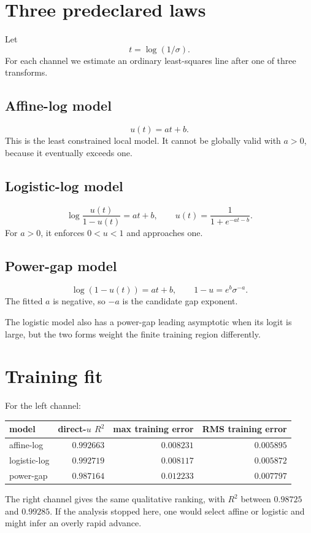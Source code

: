 \documentclass[12pt]{article}
\theoremstyle{remark}\newtheorem{remark}[theorem]{Remark}
\begin{document}
\section{Three predeclared laws}

Let
\begin{equation}
 t=\log(1/\sigma).
\end{equation}
For each channel we estimate an ordinary least-squares line after one of
three transforms.

\subsection{Affine-log model}
\begin{equation}\label{eq:affine}
 u(t)=at+b.
\end{equation}
This is the least constrained local model.  It cannot be globally valid with
$a>0$, because it eventually exceeds one.

\subsection{Logistic-log model}
\begin{equation}\label{eq:logistic}
 \log\frac{u(t)}{1-u(t)}=at+b,
 \qquad
 u(t)=\frac{1}{1+e^{-at-b}}.
\end{equation}
For $a>0$, it enforces $0<u<1$ and approaches one.

\subsection{Power-gap model}
\begin{equation}\label{eq:power}
 \log(1-u(t))=at+b,
 \qquad
 1-u=e^b\sigma^{-a}.
\end{equation}
The fitted $a$ is negative, so $-a$ is the candidate gap exponent.

The logistic model also has a power-gap leading asymptotic when its logit is
large, but the two forms weight the finite training region differently.

\section{Training fit}

For the left channel:
\begin{center}
\begin{tabular}{lrrr}
\toprule
model & direct-$u$ $R^2$ & max training error & RMS training error\\
\midrule
affine-log & $0.992663$ & $0.008231$ & $0.005895$\\
logistic-log & $0.992719$ & $0.008117$ & $0.005872$\\
power-gap & $0.987164$ & $0.012233$ & $0.007797$\\
\bottomrule
\end{tabular}
\end{center}
The right channel gives the same qualitative ranking, with $R^2$ between
$0.98725$ and $0.99285$.  If the analysis stopped here, one would select
affine or logistic and might infer an overly rapid advance.
\end{document}

